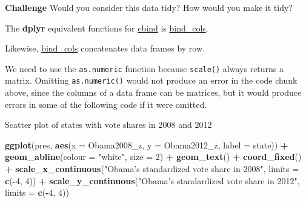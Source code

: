 \documentclass[]{book}
\newenvironment{Shaded}{\begin{snugshade}}{\end{snugshade}}
\newcommand{\DataTypeTok}[1]{\textcolor[rgb]{0.13,0.29,0.53}{#1}}
\newcommand{\DecValTok}[1]{\textcolor[rgb]{0.00,0.00,0.81}{#1}}
\newcommand{\KeywordTok}[1]{\textcolor[rgb]{0.13,0.29,0.53}{\textbf{#1}}}
\newcommand{\NormalTok}[1]{#1}
\newcommand{\OperatorTok}[1]{\textcolor[rgb]{0.81,0.36,0.00}{\textbf{#1}}}
\newcommand{\StringTok}[1]{\textcolor[rgb]{0.31,0.60,0.02}{#1}}
\theoremstyle{definition}
\theoremstyle{definition}
\theoremstyle{definition}
\theoremstyle{remark}
\begin{document}
\textbf{Challenge} Would you consider this data tidy? How would you make
it tidy?

The \textbf{dplyr} equivalent functions for
\href{https://www.rdocumentation.org/packages/base/topics/cbind}{cbind}
is
\href{https://www.rdocumentation.org/packages/dplyr/topics/bind_cols}{bind\_cols}.

\begin{Shaded}
\end{Shaded}

Likewise,
\href{https://www.rdocumentation.org/packages/dplyr/topics/bind_cols}{bind\_cols}
concatenates data frames by row.

We need to use the \texttt{as.numeric} function because \texttt{scale()}
always returns a matrix. Omitting \texttt{as.numeric()} would not
produce an error in the code chunk above, since the columns of a data
frame can be matrices, but it would produce errors in some of the
following code if it were omitted.

Scatter plot of states with vote shares in 2008 and 2012

\begin{Shaded}
\begin{Highlighting}[]
\KeywordTok{ggplot}\NormalTok{(pres, }\KeywordTok{aes}\NormalTok{(}\DataTypeTok{x =}\NormalTok{ Obama2008_z, }\DataTypeTok{y =}\NormalTok{ Obama2012_z, }\DataTypeTok{label =}\NormalTok{ state)) }\OperatorTok{+}
\StringTok{  }\KeywordTok{geom_abline}\NormalTok{(}\DataTypeTok{colour =} \StringTok{"white"}\NormalTok{, }\DataTypeTok{size =} \DecValTok{2}\NormalTok{) }\OperatorTok{+}
\StringTok{  }\KeywordTok{geom_text}\NormalTok{() }\OperatorTok{+}
\StringTok{  }\KeywordTok{coord_fixed}\NormalTok{() }\OperatorTok{+}
\StringTok{  }\KeywordTok{scale_x_continuous}\NormalTok{(}\StringTok{"Obama's standardized vote share in 2008"}\NormalTok{,}
                     \DataTypeTok{limits =} \KeywordTok{c}\NormalTok{(}\OperatorTok{-}\DecValTok{4}\NormalTok{, }\DecValTok{4}\NormalTok{)) }\OperatorTok{+}
\StringTok{  }\KeywordTok{scale_y_continuous}\NormalTok{(}\StringTok{"Obama's standardized vote share in 2012"}\NormalTok{,}
                     \DataTypeTok{limits =} \KeywordTok{c}\NormalTok{(}\OperatorTok{-}\DecValTok{4}\NormalTok{, }\DecValTok{4}\NormalTok{))}
\end{Highlighting}
\end{Shaded}
\end{document}
